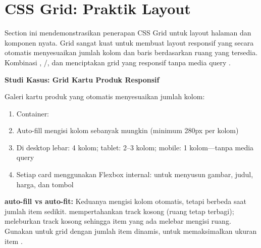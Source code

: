 \section{CSS Grid: Praktik Layout}

Section ini mendemonstrasikan penerapan CSS Grid untuk layout halaman dan komponen nyata. Grid sangat kuat untuk membuat layout responsif yang secara otomatis menyesuaikan jumlah kolom dan baris berdasarkan ruang yang tersedia. Kombinasi , /, dan  menciptakan grid yang responsif tanpa media query \cite{mdnCss}.


\begin{contoh}
\textbf{Studi Kasus: Grid Kartu Produk Responsif}

Galeri kartu produk yang otomatis menyesuaikan jumlah kolom:
\begin{enumerate}
  \item Container: 
  \item Auto-fill mengisi kolom sebanyak mungkin (minimum 280px per kolom)
  \item Di desktop lebar: 4 kolom; tablet: 2--3 kolom; mobile: 1 kolom---tanpa media query
  \item Setiap card menggunakan Flexbox internal:  untuk menyusun gambar, judul, harga, dan tombol
\end{enumerate}
\end{contoh}

\begin{catatan}
\textbf{auto-fill vs auto-fit:} Keduanya mengisi kolom otomatis, tetapi berbeda saat jumlah item sedikit.  mempertahankan track kosong (ruang tetap terbagi);  meleburkan track kosong sehingga item yang ada melebar mengisi ruang. Gunakan  untuk grid dengan jumlah item dinamis,  untuk memaksimalkan ukuran item \cite{cssTricks}.
\end{catatan}

